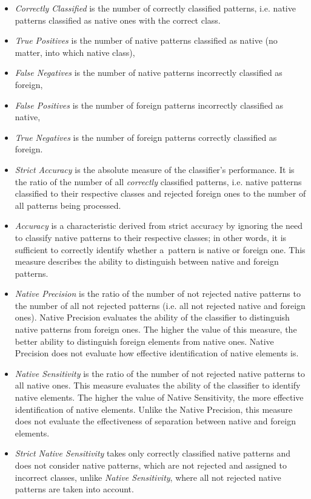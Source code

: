 \documentclass{llncs}
\begin{document}
\begin{itemize}
  \item \emph{Correctly Classified} is the number of correctly classified patterns, i.e. native patterns classified as native ones with the correct class.
  \item \emph{True Positives} is the number of native patterns classified as native (no matter, into which native class),
  \item \emph{False Negatives} is the number of native patterns incorrectly classified as foreign,
  \item \emph{False Positives} is the number of foreign patterns incorrectly classified as native,
  \item \emph{True Negatives} is the number of foreign patterns correctly classified as foreign.
  \item \emph{Strict Accuracy} is the absolute measure of the classifier's performance. It is the ratio of the number of all \emph{correctly} classified patterns, i.e. native patterns classified to their respective classes and rejected foreign ones to the number of all patterns being processed.
  \item \emph{Accuracy} is a characteristic derived from strict accuracy by ignoring the need to classify native patterns to their respective classes; in other words, it is sufficient to correctly identify whether a~pattern is native or foreign one. This measure describes the ability to distinguish between native and foreign patterns.
  \item \emph{Native Precision} is the ratio of the number of not rejected native patterns to the number of all not rejected patterns (i.e. all not rejected native and foreign ones). Native Precision evaluates the ability of the classifier to distinguish native patterns from foreign ones. The higher the value of this measure, the better ability to distinguish foreign elements from native ones. Native Precision does not evaluate how effective identification of native elements is.
  \item \emph{Native Sensitivity} is the ratio of the number of not rejected native patterns to all native ones. This measure evaluates the ability of the classifier to identify native elements. The higher the value of Native Sensitivity, the more effective identification of native elements. Unlike the Native Precision, this measure does not evaluate the effectiveness of separation between native and foreign elements.
  \item \emph{Strict Native Sensitivity} takes only correctly classified native patterns and does not consider native patterns, which are not rejected and assigned to incorrect classes, unlike \emph{Native Sensitivity}, where all not rejected native patterns are taken into account.

\end{itemize}
\end{document}

